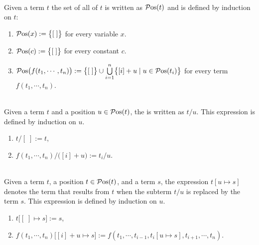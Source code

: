 \begin{Definition} \hspace*{\fill} \\
  Given a term $t$ the set of all  of $t$ is written as $\mathcal{P}\mathrm{os}(t)$ and is defined by
  induction on $t$:
  \begin{enumerate}
  \item $\mathcal{P}\mathrm{os}(x) := \bigl\{ [\;] \bigr\}$ \quad for every variable $x$.
  \item $\mathcal{P}\mathrm{os}(c) := \bigl\{ [\;] \bigr\}$ \quad for every constant $c$.
  \item $\mathcal{P}\mathrm{os}\bigl(f(t_1,\cdots,t_n)\bigr) := 
         \bigl\{ [\;] \bigr\} \cup \bigcup\limits_{i=1}^n \bigl\{ [i] + u \mid u \in \mathcal{P}\mathrm{os}(t_i) \bigr\}$ 
        \quad for every term $f(t_1,\cdots,t_n)$. \eoxs
  \end{enumerate}
\end{Definition}

\begin{Definition} \hspace*{\fill} \\
  Given a term $t$ and a position $u \in \mathcal{P}\mathrm{os}(t)$, the  is
  written as $t/u$.  This expression is defined by induction on $u$.
  \begin{enumerate}
  \item $t/[\;] := t$,
  \item $f(t_1,\cdots,t_n)/\bigl([i]+u\bigr) := t_i/u$.  \eoxs
  \end{enumerate}
\end{Definition}
\pagebreak

\begin{Definition} \hspace*{\fill} \\
  Given a term $t$, a position $t \in \mathcal{P}\mathrm{os}(t)$, and a term $s$, the expression
  $t[u \mapsto s]$ denotes the term that results from $t$ when the subterm $t/u$ is replaced by the term 
  $s$.  This expression is defined by induction on $u$.
  \begin{enumerate}
  \item $t\bigl[ [\;] \mapsto s \bigr] := s$,
  \item $f(t_1,\cdots,t_n)\bigl[ [i]+u \mapsto s \bigr] := f(t_1, \cdots, t_{i-1},t_i[u \mapsto s], t_{i+1},\cdots, t_n)$.  
        \eoxs
  \end{enumerate}
\end{Definition}
  
